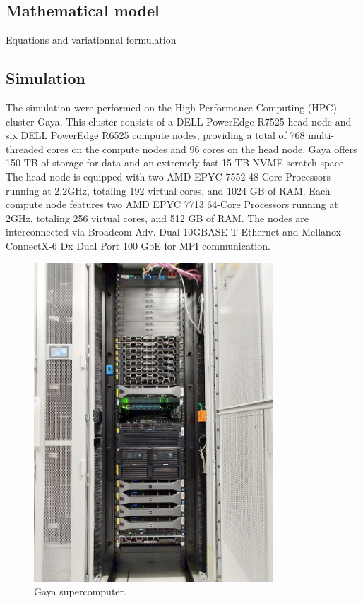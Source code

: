 \documentclass[12pt]{article}
\begin{document}
\subsection{Mathematical model}
Equations and variationnal formulation

\subsection{Simulation}
The simulation were performed on the High-Performance Computing (HPC) cluster Gaya.
This cluster consists of a DELL PowerEdge R7525 head node and six DELL PowerEdge 
R6525 compute nodes, providing a total of 768 multi-threaded cores on the compute 
nodes and 96 cores on the head node. Gaya offers 150 TB of storage for data and an 
extremely fast 15 TB NVME scratch space. The head node is equipped with two AMD 
EPYC 7552 48-Core Processors running at 2.2GHz, totaling 192 virtual cores, and 
1024 GB of RAM. Each compute node features two AMD EPYC 7713 64-Core Processors 
running at 2GHz, totaling 256 virtual cores, and 512 GB of RAM. The nodes are 
interconnected via Broadcom Adv. Dual 10GBASE-T Ethernet and Mellanox ConnectX-6 
Dx Dual Port 100 GbE for MPI communication.
\begin{figure}[H]
	\centering
	\includegraphics[width=0.8\textwidth, angle=-90]{images/gaya.jpeg}
	\caption{Gaya supercomputer.}
\end{figure}
\end{document}
